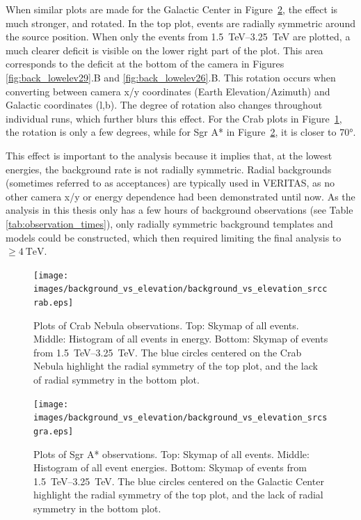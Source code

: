   When similar plots are made for the Galactic Center in Figure~\ref{fig:bkgvsel_sgra}, the effect is much stronger, and rotated.
  In the top plot, events are radially symmetric around the source position.
  When only the events from \SIrange{1.5}{3.25}{\TeV} are plotted, a much clearer deficit is visible on the lower right part of the plot.
  This area corresponds to the deficit at the bottom of the camera in Figures \ref{fig:back_lowelev29}.B and \ref{fig:back_lowelev26}.B.
  This rotation occurs when converting between camera x/y coordinates (Earth Elevation/Azimuth) and Galactic coordinates (l,b).
  The degree of rotation also changes throughout individual runs, which further blurs this effect.
  For the Crab plots in Figure~\ref{fig:bkgvsel_crab}, the rotation is only a few degrees, while for Sgr A* in Figure~\ref{fig:bkgvsel_sgra}, it is closer to \ang{70}.
  
  This effect is important to the analysis because it implies that, at the lowest energies, the background rate is not radially symmetric.
  Radial backgrounds (sometimes referred to as acceptances) are typically used in VERITAS, as no other camera x/y or energy dependence had been demonstrated until now.
  As the analysis in this thesis only has a few hours of background observations (see Table \ref{tab:observation_times}), only radially symmetric background templates and models could be constructed, which then required limiting the final analysis to $\geq\SI{4}{\TeV}$.
  
  \begin{figure}[ht]
    \centering
    \texttt{[image: images/background\_vs\_elevation/background\_vs\_elevation\_srccrab.eps]}
    \caption[Background Vs Elevation Crab]
    {\small 
      Plots of Crab Nebula observations.
      Top: Skymap of all events.
      Middle: Histogram of all events in energy.
      Bottom: Skymap of events from \SIrange{1.5}{3.25}{\TeV}.  
      The blue circles centered on the Crab Nebula highlight the radial symmetry of the top plot, and the lack of radial symmetry in the bottom plot.
    }
    \label{fig:bkgvsel_crab}
  \end{figure}

  \begin{figure}[ht]
    \centering
    \texttt{[image: images/background\_vs\_elevation/background\_vs\_elevation\_srcsgra.eps]}
    \caption[Background Vs Elevation Sgr A*]
    {\small 
      Plots of Sgr A* observations.
      Top: Skymap of all events.
      Middle: Histogram of all event energies.
      Bottom: Skymap of events from \SIrange{1.5}{3.25}{\TeV}.  
      The blue circles centered on the Galactic Center highlight the radial symmetry of the top plot, and the lack of radial symmetry in the bottom plot.
    }
    \label{fig:bkgvsel_sgra}
  \end{figure}
  
